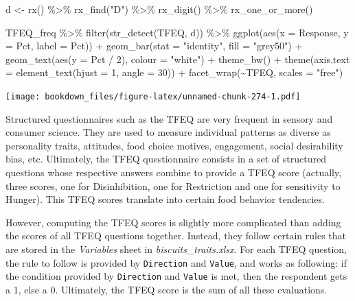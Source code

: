 \documentclass[
]{krantz}
\makeatletter
\newenvironment{Shaded}{\begin{snugshade}}{\end{snugshade}}
\newcommand{\AttributeTok}[1]{\textcolor[rgb]{0.61,0.61,0.61}{#1}}
\newcommand{\DecValTok}[1]{\textcolor[rgb]{0.06,0.06,0.06}{#1}}
\newcommand{\FunctionTok}[1]{\textcolor[rgb]{0,0,0}{#1}}
\newcommand{\NormalTok}[1]{#1}
\newcommand{\OtherTok}[1]{\textcolor[rgb]{0.37,0.37,0.37}{#1}}
\newcommand{\SpecialCharTok}[1]{\textcolor[rgb]{0,0,0}{#1}}
\newcommand{\StringTok}[1]{\textcolor[rgb]{0.5,0.5,0.5}{#1}}
\newenvironment{kframe}{%
\medskip{}
\setlength{\fboxsep}{.8em}
 \def\at@end@of@kframe{}%
 \ifinner\ifhmode%
  \def\at@end@of@kframe{\end{minipage}}%
  \begin{minipage}{\columnwidth}%
 \fi\fi%
 \def\FrameCommand##1{\hskip\@totalleftmargin \hskip-\fboxsep
 \colorbox{shadecolor}{##1}\hskip-\fboxsep
     \hskip-\linewidth \hskip-\@totalleftmargin \hskip\columnwidth}%
 \MakeFramed {\advance\hsize-\width
   \@totalleftmargin\z@ \linewidth\hsize
   \@setminipage}}%
 {\par\unskip\endMakeFramed%
 \at@end@of@kframe}
\renewenvironment{Shaded}{\begin{kframe}}{\end{kframe}}
\makeatother
\begin{document}
\begin{Shaded}
\begin{Highlighting}[]
\NormalTok{d }\OtherTok{\textless{}{-}} \FunctionTok{rx}\NormalTok{() }\SpecialCharTok{\%\textgreater{}\%}
  \FunctionTok{rx\_find}\NormalTok{(}\StringTok{"D"}\NormalTok{) }\SpecialCharTok{\%\textgreater{}\%}
  \FunctionTok{rx\_digit}\NormalTok{() }\SpecialCharTok{\%\textgreater{}\%}
  \FunctionTok{rx\_one\_or\_more}\NormalTok{()}

\NormalTok{TFEQ\_freq }\SpecialCharTok{\%\textgreater{}\%}
  \FunctionTok{filter}\NormalTok{(}\FunctionTok{str\_detect}\NormalTok{(TFEQ, d)) }\SpecialCharTok{\%\textgreater{}\%}
  \FunctionTok{ggplot}\NormalTok{(}\FunctionTok{aes}\NormalTok{(}\AttributeTok{x =}\NormalTok{ Response, }\AttributeTok{y =}\NormalTok{ Pct, }\AttributeTok{label =}\NormalTok{ Pct)) }\SpecialCharTok{+}
  \FunctionTok{geom\_bar}\NormalTok{(}\AttributeTok{stat =} \StringTok{"identity"}\NormalTok{, }\AttributeTok{fill =} \StringTok{"grey50"}\NormalTok{) }\SpecialCharTok{+}
  \FunctionTok{geom\_text}\NormalTok{(}\FunctionTok{aes}\NormalTok{(}\AttributeTok{y =}\NormalTok{ Pct }\SpecialCharTok{/} \DecValTok{2}\NormalTok{), }\AttributeTok{colour =} \StringTok{"white"}\NormalTok{) }\SpecialCharTok{+}
  \FunctionTok{theme\_bw}\NormalTok{() }\SpecialCharTok{+}
  \FunctionTok{theme}\NormalTok{(}\AttributeTok{axis.text =} \FunctionTok{element\_text}\NormalTok{(}\AttributeTok{hjust =} \DecValTok{1}\NormalTok{, }\AttributeTok{angle =} \DecValTok{30}\NormalTok{)) }\SpecialCharTok{+}
  \FunctionTok{facet\_wrap}\NormalTok{(}\SpecialCharTok{\textasciitilde{}}\NormalTok{TFEQ, }\AttributeTok{scales =} \StringTok{"free"}\NormalTok{)}
\end{Highlighting}
\end{Shaded}

\texttt{[image: bookdown\_files/figure-latex/unnamed-chunk-274-1.pdf]}

Structured questionnaires such as the TFEQ are very frequent in sensory and consumer science. They are used to measure individual patterns as diverse as personality traits, attitudes, food choice motives, engagement, social desirability bias, etc. Ultimately, the TFEQ questionnaire consists in a set of structured questions whose respective answers combine to provide a TFEQ score (actually, three scores, one for Disinhibition, one for Restriction and one for sensitivity to Hunger). This TFEQ scores translate into certain food behavior tendencies.

However, computing the TFEQ scores is slightly more complicated than adding the scores of all TFEQ questions together. Instead, they follow certain rules that are stored in the \emph{Variables} sheet in \emph{biscuits\_traits.xlsx}. For each TFEQ question, the rule to follow is provided by \texttt{Direction} and \texttt{Value}, and works as following: if the condition provided by \texttt{Direction} and \texttt{Value} is met, then the respondent gets a 1, else a 0. Ultimately, the TFEQ score is the sum of all these evaluations.
\end{document}
